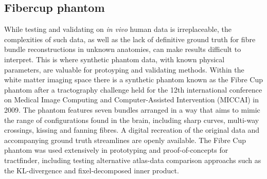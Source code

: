\subsection{Fibercup phantom}

While testing and validating on \textit{in vivo} human data is irreplaceable, the complexities of such data, as well as the lack of definitive ground truth for fibre bundle reconstructions in unknown anatomies, can make results difficult to interpret.
This is where synthetic phantom data, with known physical parameters, are valuable for protoyping and validating methods.
Within the white matter imaging space there is a synthetic phantom known as the Fibre Cup phantom after a tractography challenge held for the 12th international conference on Medical Image Computing and Computer-Assisted Intervention (MICCAI) in 2009.\autocite{Fillard2011}
The phantom features seven bundles arranged in a way that aims to mimic the range of configurations found in the brain, including sharp curves, multi-way crossings, kissing and fanning fibres.
A digital recreation of the original data and accompanying ground truth streamlines are openly available.\autocite{NITRC}
The Fibre Cup phantom was used extensively in prototyping and proof-of-concepts for tractfinder, including testing alternative atlas-data comparison approachs such as the KL-divergence and fixel-decomposed inner product.
